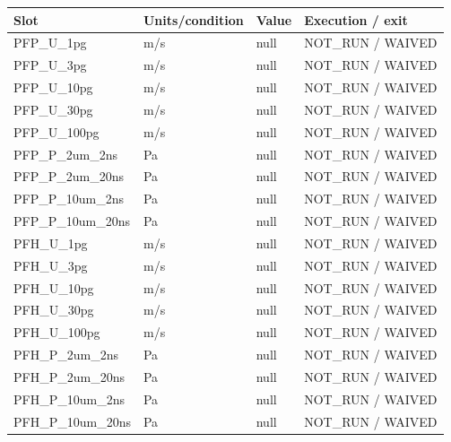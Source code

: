 \begin{longtable}{p{.28\linewidth}p{.19\linewidth}p{.18\linewidth}>{\raggedright\arraybackslash}p{.20\linewidth}}\toprule
Slot & Units/condition & Value & Execution / exit\\\midrule\endhead
PFP\_U\_1pg & m/s & null & NOT\_RUN / WAIVED\\
PFP\_U\_3pg & m/s & null & NOT\_RUN / WAIVED\\
PFP\_U\_10pg & m/s & null & NOT\_RUN / WAIVED\\
PFP\_U\_30pg & m/s & null & NOT\_RUN / WAIVED\\
PFP\_U\_100pg & m/s & null & NOT\_RUN / WAIVED\\
PFP\_P\_2um\_2ns & Pa & null & NOT\_RUN / WAIVED\\
PFP\_P\_2um\_20ns & Pa & null & NOT\_RUN / WAIVED\\
PFP\_P\_10um\_2ns & Pa & null & NOT\_RUN / WAIVED\\
PFP\_P\_10um\_20ns & Pa & null & NOT\_RUN / WAIVED\\
PFH\_U\_1pg & m/s & null & NOT\_RUN / WAIVED\\
PFH\_U\_3pg & m/s & null & NOT\_RUN / WAIVED\\
PFH\_U\_10pg & m/s & null & NOT\_RUN / WAIVED\\
PFH\_U\_30pg & m/s & null & NOT\_RUN / WAIVED\\
PFH\_U\_100pg & m/s & null & NOT\_RUN / WAIVED\\
PFH\_P\_2um\_2ns & Pa & null & NOT\_RUN / WAIVED\\
PFH\_P\_2um\_20ns & Pa & null & NOT\_RUN / WAIVED\\
PFH\_P\_10um\_2ns & Pa & null & NOT\_RUN / WAIVED\\
PFH\_P\_10um\_20ns & Pa & null & NOT\_RUN / WAIVED\\
\bottomrule\end{longtable}
